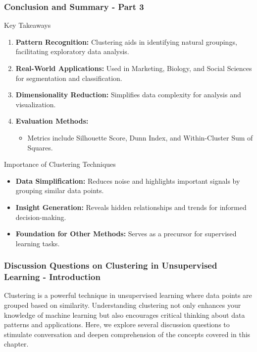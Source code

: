 \documentclass[aspectratio=169]{beamer}
\begin{document}
\begin{frame}[fragile]
    \frametitle{Conclusion and Summary - Part 3}

    \begin{block}{Key Takeaways}
        \begin{enumerate}
            \item \textbf{Pattern Recognition:} Clustering aids in identifying natural groupings, facilitating exploratory data analysis.
            \item \textbf{Real-World Applications:} Used in Marketing, Biology, and Social Sciences for segmentation and classification.
            \item \textbf{Dimensionality Reduction:} Simplifies data complexity for analysis and visualization.
            \item \textbf{Evaluation Methods:} 
            \begin{itemize}
                \item Metrics include Silhouette Score, Dunn Index, and Within-Cluster Sum of Squares.
            \end{itemize}
        \end{enumerate}
    \end{block}

    \begin{block}{Importance of Clustering Techniques}
        \begin{itemize}
            \item \textbf{Data Simplification:} Reduces noise and highlights important signals by grouping similar data points.
            \item \textbf{Insight Generation:} Reveals hidden relationships and trends for informed decision-making.
            \item \textbf{Foundation for Other Methods:} Serves as a precursor for supervised learning tasks.
        \end{itemize}
    \end{block}
\end{frame}

\begin{frame}[fragile]
  \frametitle{Discussion Questions on Clustering in Unsupervised Learning - Introduction}
  Clustering is a powerful technique in unsupervised learning where data points are grouped based on similarity. 
  Understanding clustering not only enhances your knowledge of machine learning but also encourages critical thinking about data patterns and applications. 
  Here, we explore several discussion questions to stimulate conversation and deepen comprehension of the concepts covered in this chapter.
\end{frame}
\end{document}
